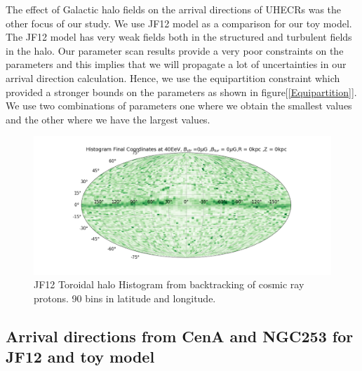 \documentclass[12pt, a4 paper]{article}
\begin{document}
The effect of Galactic halo fields on the arrival directions of UHECRs was the other focus of our study. We use JF12 model as a comparison for our toy model. The JF12 model has very weak fields both in the structured and turbulent fields in the halo. Our parameter scan results provide a very poor constraints on the parameters and this implies that we will propagate a lot of uncertainties in our arrival direction calculation. Hence, we use the equipartition constraint which provided a stronger bounds on the parameters as shown in figure[\ref{Equipartition}]. We use two combinations of parameters one where we obtain the smallest values and the other where we have the largest values.

\begin{figure}[h!]
    \centering
    \includegraphics[width = 14cm]{Images/JF12_Proton_Final_Coordinates_Hist_Energy40_Bstr_0_Btur_0_R_0_Z_0.png}%
    \caption{\rm {JF12 Toroidal halo} Histogram from backtracking of cosmic ray protons. 90 bins in latitude and longitude.}
    \label{fig:my_label}
\end{figure}


\subsection{Arrival directions from CenA and NGC253 for JF12 and toy model}
\end{document}
